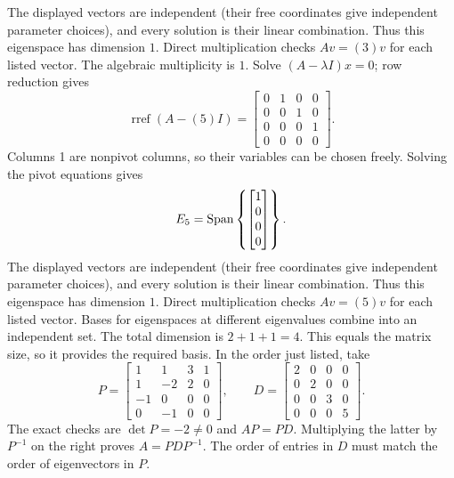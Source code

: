 The displayed vectors are independent (their free coordinates give independent parameter choices), and every solution is their linear combination. Thus this eigenspace has dimension $1$. Direct multiplication checks $Av=(3)v$ for each listed vector.
The algebraic multiplicity is $1$. Solve $(A-\lambda I)x=0$; row reduction gives
\[\operatorname{rref}(A-(5)I)=\begin{bmatrix}0&1&0&0\\0&0&1&0\\0&0&0&1\\0&0&0&0\end{bmatrix}.\]
Columns 1 are nonpivot columns, so their variables can be chosen freely. Solving the pivot equations gives
\[E_{5}=\operatorname{Span}\left\{\begin{bmatrix}1\\0\\0\\0\end{bmatrix}\right\}.\]
The displayed vectors are independent (their free coordinates give independent parameter choices), and every solution is their linear combination. Thus this eigenspace has dimension $1$. Direct multiplication checks $Av=(5)v$ for each listed vector.
Bases for eigenspaces at different eigenvalues combine into an independent set. The total dimension is $2+1+1=4$.
This equals the matrix size, so it provides the required basis. In the order just listed, take
\[P=\begin{bmatrix}1&1&3&1\\1&-2&2&0\\-1&0&0&0\\0&-1&0&0\end{bmatrix},\qquad D=\begin{bmatrix}2&0&0&0\\0&2&0&0\\0&0&3&0\\0&0&0&5\end{bmatrix}.\]
The exact checks are $\det P=-2\ne0$ and $AP=PD$. Multiplying the latter by $P^{-1}$ on the right proves $A=PDP^{-1}$. The order of entries in $D$ must match the order of eigenvectors in $P$.


